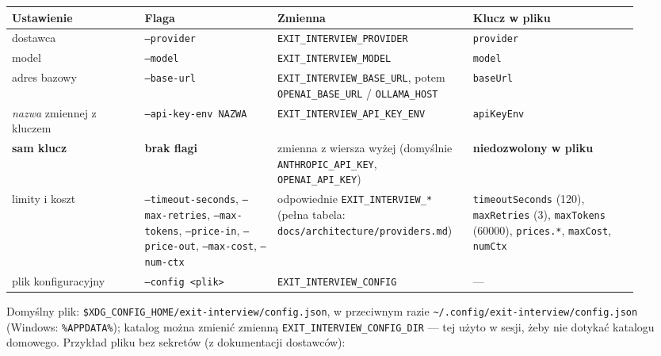 {\begin{center}
\small
\begin{longtable}{@{}>{\raggedright\arraybackslash}p{0.2\linewidth}>{\raggedright\arraybackslash}p{0.2\linewidth}>{\raggedright\arraybackslash}p{0.27\linewidth}>{\raggedright\arraybackslash}p{0.25\linewidth}@{}}
\toprule
Ustawienie & Flaga & Zmienna & Klucz w pliku \\
\midrule
\endhead
dostawca & \texttt{--provider} & \texttt{EXIT\_\allowbreak{}INTERVIEW\_\allowbreak{}PROVIDER} & \texttt{provider} \\
model & \texttt{--model} & \texttt{EXIT\_\allowbreak{}INTERVIEW\_\allowbreak{}MODEL} & \texttt{model} \\
adres bazowy & \texttt{--base-url} & \texttt{EXIT\_\allowbreak{}INTERVIEW\_\allowbreak{}BASE\_\allowbreak{}URL}, potem \texttt{OPENAI\_\allowbreak{}BASE\_\allowbreak{}URL} / \texttt{OLLAMA\_HOST} & \texttt{baseUrl} \\
\emph{nazwa} zmiennej z kluczem & \texttt{--api-\allowbreak{}key-\allowbreak{}env NAZWA} & \texttt{EXIT\_\allowbreak{}INTERVIEW\_\allowbreak{}API\_\allowbreak{}KEY\_\allowbreak{}ENV} & \texttt{apiKeyEnv} \\
\textbf{sam klucz} & \textbf{brak flagi} & zmienna z wiersza wyżej (domyślnie \texttt{ANTHROPIC\_\allowbreak{}API\_\allowbreak{}KEY}, \texttt{OPENAI\_\allowbreak{}API\_\allowbreak{}KEY}) & \textbf{niedozwolony w pliku} \\
limity i koszt & \texttt{--timeout-seconds}, \texttt{--max-retries}, \texttt{--max-tokens}, \texttt{--price-in}, \texttt{--price-out}, \texttt{--max-cost}, \texttt{--num-ctx} & odpowiednie \texttt{EXIT\_\allowbreak{}INTERVIEW\_\allowbreak{}*} (pełna tabela: \texttt{docs/\allowbreak{}architecture/\allowbreak{}providers.\allowbreak{}md}) & \texttt{timeoutSeconds} (120), \texttt{maxRetries} (3), \texttt{maxTokens} (60000), \texttt{prices.*}, \texttt{maxCost}, \texttt{numCtx} \\
plik konfiguracyjny & \texttt{--config <plik>} & \texttt{EXIT\_\allowbreak{}INTERVIEW\_\allowbreak{}CONFIG} & --- \\
\bottomrule
\end{longtable}
\end{center}

Domyślny plik: \texttt{\$XDG\_\allowbreak{}CONFIG\_\allowbreak{}HOME/\allowbreak{}exit-\allowbreak{}interview/\allowbreak{}config.\allowbreak{}json}, w
przeciwnym razie \texttt{\~{}/.config/exit-interview/config.json} (Windows:
\texttt{\%APPDATA\%}); katalog można zmienić zmienną
\texttt{EXIT\_\allowbreak{}INTERVIEW\_\allowbreak{}CONFIG\_\allowbreak{}DIR} --- tej użyto w sesji, żeby nie dotykać
katalogu domowego. Przykład pliku bez sekretów (z dokumentacji dostawców):

}
